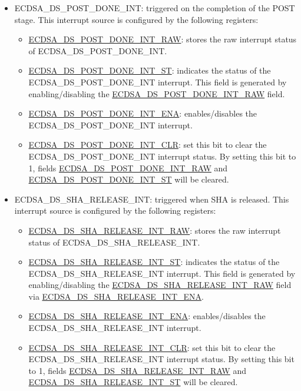 \documentclass[main\_\_EN.tex]{subfiles}
\begin{document}
\begin{itemize}
\begin{itemize}
	      \end{itemize}
	\item \label{int:ECDSADSPOSTDONEINT}ECDSA\_DS\_POST\_DONE\_INT: triggered on the completion of the POST stage. This interrupt source is configured by the following registers:
	      \begin{itemize}
		      \item \hyperref[fielddesc:ECDSADSPOSTDONEINTRAW]{ECDSA\_DS\_POST\_DONE\_INT\_RAW}: stores the raw interrupt status of ECDSA\_DS\_POST\_DONE\_INT.
		      \item \hyperref[fielddesc:ECDSADSPOSTDONEINTST]{ECDSA\_DS\_POST\_DONE\_INT\_ST}: indicates the status of the ECDSA\_DS\_POST\_DONE\_INT interrupt. This field is generated by enabling/disabling the \hyperref[fielddesc:ECDSADSPOSTDONEINTRAW]{ECDSA\_DS\_POST\_DONE\_INT\_RAW} field.
		      \item \hyperref[fielddesc:ECDSADSPOSTDONEINTENA]{ECDSA\_DS\_POST\_DONE\_INT\_ENA}: enables/disables the ECDSA\_DS\_POST\_DONE\_INT interrupt.
		      \item \hyperref[fielddesc:ECDSADSPOSTDONEINTCLR]{ECDSA\_DS\_POST\_DONE\_INT\_CLR}: set this bit to clear the ECDSA\_DS\_POST\_DONE\_INT interrupt status. By setting this bit to 1, fields \hyperref[fielddesc:ECDSADSPOSTDONEINTRAW]{ECDSA\_DS\_POST\_DONE\_INT\_RAW} and  \hyperref[fielddesc:ECDSADSPOSTDONEINTST]{ECDSA\_DS\_POST\_DONE\_INT\_ST} will be cleared.
	      \end{itemize}
	\item \label{int:ECDSADSSHARELEASEINT}ECDSA\_DS\_SHA\_RELEASE\_INT: triggered when SHA is released. This interrupt source is configured by the following registers:
	      \begin{itemize}
		      \item \hyperref[fielddesc:ECDSADSSHARELEASEINTRAW]{ECDSA\_DS\_SHA\_RELEASE\_INT\_RAW}: stores the raw interrupt status of ECDSA\_DS\_SHA\_RELEASE\_INT.
		      \item \hyperref[fielddesc:ECDSADSSHARELEASEINTST]{ECDSA\_DS\_SHA\_RELEASE\_INT\_ST}: indicates the status of the ECDSA\_DS\_SHA\_RELEASE\_INT interrupt. This field is generated by enabling/disabling the \hyperref[fielddesc:ECDSADSSHARELEASEINTRAW]{ECDSA\_DS\_SHA\_RELEASE\_INT\_RAW} field via \hyperref[fielddesc:ECDSADSSHARELEASEINTENA]{ECDSA\_DS\_SHA\_RELEASE\_INT\_ENA}.
		      \item \hyperref[fielddesc:ECDSADSSHARELEASEINTENA]{ECDSA\_DS\_SHA\_RELEASE\_INT\_ENA}: enables/disables the ECDSA\_DS\_SHA\_RELEASE\_INT interrupt.
		      \item \hyperref[fielddesc:ECDSADSSHARELEASEINTCLR]{ECDSA\_DS\_SHA\_RELEASE\_INT\_CLR}: set this bit to clear the ECDSA\_DS\_SHA\_RELEASE\_INT interrupt status. By setting this bit to 1, fields \hyperref[fielddesc:ECDSADSSHARELEASEINTRAW]{ECDSA\_DS\_SHA\_RELEASE\_INT\_RAW} and  \hyperref[fielddesc:ECDSADSSHARELEASEINTST]{ECDSA\_DS\_SHA\_RELEASE\_INT\_ST} will be cleared.
	      \end{itemize}
\end{itemize}
\end{document}
